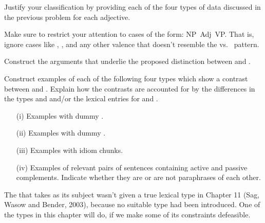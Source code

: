\documentclass[a4paper,landscape,headrule,footrule]{foils}
\begin{document}
\noindent
Justify your classification by providing each of the four types
of data discussed in the previous problem for each adjective.

Make sure to restrict your attention to cases of the form: \hbox{NP
   Adj  VP}. That is, ignore cases like , , and
any other valence that doesn't resemble the  vs.\
 pattern.


Construct the arguments that underlie the proposed distinction between
\typ{orv-lxm} and \typ{ocv-lxm}.

Construct examples of each of the following four types which 
show a contrast between  and .  Explain how
the contrasts are accounted for by the differences in the types
 and  and/or the lexical entries for 
and \lex{persuade}.

\begin{itemize} \addtolength{\itemsep}{-1ex}
\item[(i)] Examples with dummy .

\item[(ii)] Examples with dummy .

\item[(iii)] Examples with idiom chunks.

\item[(iv)] Examples of relevant pairs of sentences containing 
active and passive complements.  Indicate whether they are or are
not paraphrases of each other.
\end{itemize}





The  that takes  as its subject wasn't given a true
lexical type in Chapter 11 (Sag, Wasow and Bender, 2003), because no
suitable type had been introduced.  One of the types in this chapter
will do, if we make some of its constraints defeasible.
\end{document}
